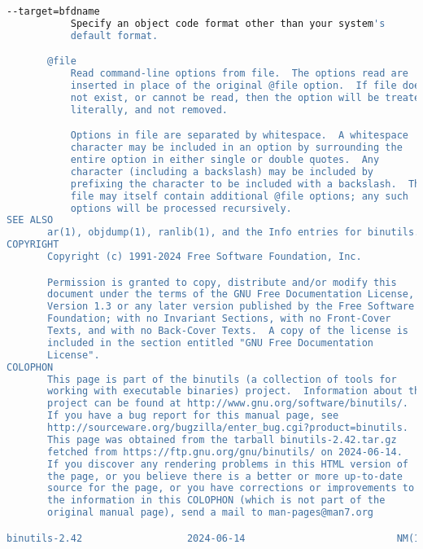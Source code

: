 {{\begin{lstlisting}[language=bash]
       --target=bfdname
           Specify an object code format other than your system's
           default format.

       @file
           Read command-line options from file.  The options read are
           inserted in place of the original @file option.  If file does
           not exist, or cannot be read, then the option will be treated
           literally, and not removed.

           Options in file are separated by whitespace.  A whitespace
           character may be included in an option by surrounding the
           entire option in either single or double quotes.  Any
           character (including a backslash) may be included by
           prefixing the character to be included with a backslash.  The
           file may itself contain additional @file options; any such
           options will be processed recursively.
SEE ALSO
       ar(1), objdump(1), ranlib(1), and the Info entries for binutils.
COPYRIGHT
       Copyright (c) 1991-2024 Free Software Foundation, Inc.

       Permission is granted to copy, distribute and/or modify this
       document under the terms of the GNU Free Documentation License,
       Version 1.3 or any later version published by the Free Software
       Foundation; with no Invariant Sections, with no Front-Cover
       Texts, and with no Back-Cover Texts.  A copy of the license is
       included in the section entitled "GNU Free Documentation
       License".
COLOPHON
       This page is part of the binutils (a collection of tools for
       working with executable binaries) project.  Information about the
       project can be found at http://www.gnu.org/software/binutils/.
       If you have a bug report for this manual page, see
       http://sourceware.org/bugzilla/enter_bug.cgi?product=binutils.
       This page was obtained from the tarball binutils-2.42.tar.gz
       fetched from https://ftp.gnu.org/gnu/binutils/ on 2024-06-14.
       If you discover any rendering problems in this HTML version of
       the page, or you believe there is a better or more up-to-date
       source for the page, or you have corrections or improvements to
       the information in this COLOPHON (which is not part of the
       original manual page), send a mail to man-pages@man7.org

binutils-2.42                  2024-06-14                          NM(1)\end{lstlisting}
}}
\endinput  %

